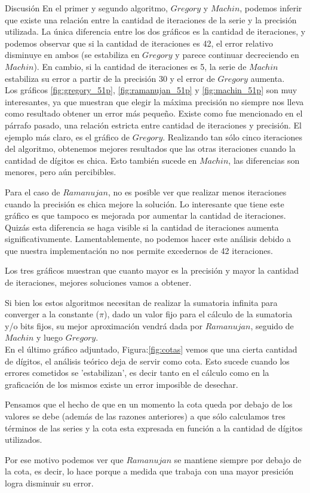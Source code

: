 \begin{section}{Discusión}
	En el primer y segundo algoritmo, $Gregory$ y $Machin$, podemos inferir que existe una relación entre la cantidad de iteraciones de la serie y la precisión utilizada. La única diferencia entre los dos gráficos es la cantidad de iteraciones, y podemos observar que si la cantidad de iteraciones es 42, el error relativo disminuye en ambos (se estabiliza en $Gregory$ y parece continuar decreciendo en $Machin$). En cambio, si la cantidad de iteraciones es 5, la serie de $Machin$ estabiliza su error a partir de la precisión 30 y el error de $Gregory$ aumenta. \\
	
	Los gráficos \ref{fig:gregory_51p}, \ref{fig:ramanujan_51p} y \ref{fig:machin_51p} son muy interesantes, ya que muestran que elegir la máxima precisión no siempre nos lleva como resultado obtener un error más pequeño. Existe como fue mencionado en el párrafo pasado, una relación estricta entre cantidad de iteraciones y precisión. El ejemplo más claro, es el gráfico de $Gregory$. Realizando tan sólo cinco iteraciones del algoritmo, obtenemos mejores resultados que las otras iteraciones cuando la cantidad de dígitos es chica. Esto también sucede en $Machin$, las diferencias son menores, pero aún percibibles.
	
	Para el caso de $Ramanujan$, no es posible ver que realizar menos iteraciones cuando la precisión es chica mejore la solución. Lo interesante que tiene este gráfico es que tampoco es mejorada por aumentar la cantidad de iteraciones. Quizás esta diferencia se haga visible si la cantidad de iteraciones aumenta significativamente. Lamentablemente, no podemos hacer este análisis debido a que nuestra implementación no nos permite excedernos de 42 iteraciones.
	
	Los tres gráficos muestran que cuanto mayor es la precisión y mayor la cantidad de iteraciones, mejores soluciones vamos a obtener.
	
	Si bien los estos algoritmos necesitan de realizar la sumatoria infinita para converger a la constante ($\pi$), dado un valor fijo para el cálculo de la sumatoria y/o bits fijos, su mejor aproximación vendrá dada por $Ramanujan$, seguido de $Machin$ y luego $Gregory$.
	\\
	
	En el último gráfico adjuntado, Figura:\ref{fig:cotas} vemos que una cierta cantidad de dígitos, el análisis teórico deja de servir como cota. Esto sucede cuando los errores cometidos se 'estabilizan', es decir tanto en el cálculo como en la graficación de los mismos existe un error imposible de desechar.
	
	Pensamos que el hecho de que en un momento la cota queda por debajo de los valores se debe (además de las razones anteriores) a que sólo calculamos tres términos de las series y la cota esta expresada en función a la cantidad de dígitos utilizados.
	
	Por ese motivo podemos ver que $Ramanujan$ se mantiene siempre por debajo de la cota, es decir, lo hace porque a medida que trabaja con una mayor presición logra disminuir su error.
\end{section}

